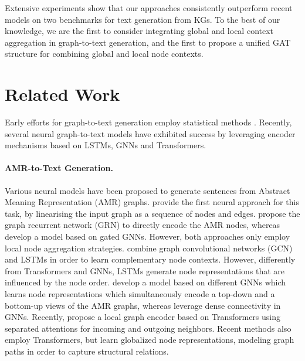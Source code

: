 \documentclass[11pt,a4paper]{article}
\begin{document}
Extensive experiments show that our approaches consistently outperform recent models on two benchmarks for text generation from KGs. To the best of our knowledge, we are the first to consider integrating global and local context aggregation in graph-to-text generation, and the first to propose a unified GAT structure for combining global and local node contexts. 




    
































 \section{Related Work}

Early efforts for graph-to-text generation employ statistical methods \cite{flanigan-etal-2016-generation, pourdamghani-etal-2016-generating, song-etal-2017-amr}. Recently, several neural \mbox{graph-to-text} models have exhibited success by leveraging encoder mechanisms based on LSTMs, GNNs and Transformers.




 \paragraph{AMR-to-Text Generation.} Various neural models have been proposed to generate  sentences from Abstract Meaning Representation (AMR) graphs. \citet{konsas_17} provide the first neural approach for this task, by linearising the input graph as a sequence of nodes and edges. \citet{song-etal-acl2018} propose the graph recurrent network (GRN) to directly encode the AMR nodes, whereas \citet{beck-etal-2018-acl2018} develop a model based on gated GNNs. However, both approaches only employ local node aggregation strategies. \citet{damonte_naacl18} combine graph convolutional networks (GCN) and LSTMs in order to learn complementary node contexts. However, differently from Transformers and GNNs, LSTMs generate node representations that are influenced by the node order. \citet{ribeiro-etal-2019-enhancing} develop a model based on different GNNs which learns node representations which simultaneously encode a top-down and a bottom-up views of the AMR graphs, whereas \citet{dcgcnforgraph2seq19guo} leverage dense connectivity in GNNs. Recently, \citet{doi:10.116200297} propose a local graph encoder based on Transformers using separated attentions for incoming and outgoing neighbors. Recent methods \cite{zhu-etal-2019-modeling,cai-lam-2020-graph} also employ Transformers, but learn globalized node representations, modeling graph paths in order to capture structural relations. 
\end{document}
